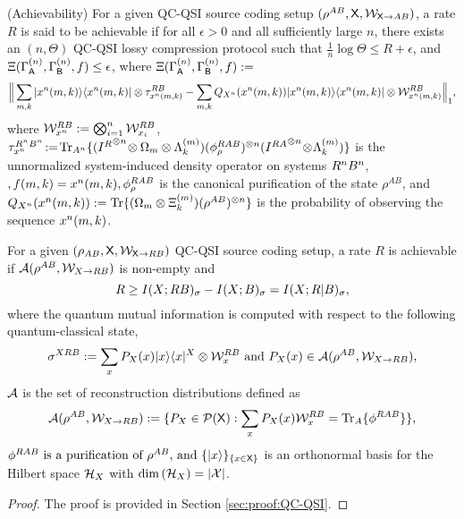 \begin{definition}\label{def:qc_qsi_achievability}
    (Achievability) For a given QC-QSI source coding setup $(\rho^{AB},\mathsf{X},\mathcal{W}_{\mathsf{X}\rightarrow AB})$, a rate $R$ is said to be achievable if for all $\epsilon > 0$ and all sufficiently large $n$, there exists an $(n,\Theta)$ QC-QSI lossy compression protocol such that 
$\frac{1}{n}\log \Theta \leq R + \epsilon$, and $\Xi(\Gamma^{(n)}_{\mathsf{A}},\Gamma^{(n)}_{\mathsf{B}},f) \leq \epsilon$, where 
$\Xi(\Gamma^{(n)}_{\mathsf{A}},\Gamma^{(n)}_{\mathsf{B}},f) :=$ 
\begin{align*}
    \Big\| \sum_{m,k} |x^n(m,k)\rangle\langle x^n(m,k)| \otimes \tau^{R B}_{x^n(m,k)}   - \sum_{m,k}  Q_{X^n}(x^n(m,k))|x^n(m,k)\rangle\langle x^n(m,k)| \otimes \mathcal{W}_{x^n(m,k)}^{RB}\Big\|_1,
\end{align*}
where $\mathcal{W}_{x^n}^{RB} := \bigotimes_{i=1}^n \mathcal{W}_{x_i}^{RB}$,  $\tau^{R^nB^n}_{x^n}\!:= \!\text{Tr}_{A^n}\{({I^{R}}^{\otimes n}\!\otimes \Omega_{m} \otimes \Lambda^{(m)}_k) (\phi^{RAB}_\rho)^{\otimes n}({I^{R A}}^{\otimes n}\! \otimes\!\Lambda^{(m)}_k)\}$ is the unnormalized system-induced density operator on systems $R^nB^n$, $, f(m,k) = x^n(m,k), \phi_{\rho}^{RAB}$ is the canonical purification of the state $\rho^{AB}$, and $Q_{X^n}(x^n(m,k)) := \text{Tr}\{(\Omega_{m} \otimes \Xi^{(m)}_k) (\rho^{AB})^{\otimes n}\}$ is the probability of observing the sequence $x^n(m,k)$.
\end{definition}
\begin{theorem}\label{thm:QC-QSI}For a given $(\rho_{AB},\mathsf{X},\mathcal{W}_{\mathsf{X}\rightarrow R B})$ QC-QSI source coding setup, 
a rate $R$ is achievable if $\mathcal{A}(\rho^{AB},\mathcal{W}_{X\rightarrow R B})$ is non-empty and
    $$R\geq I(X;R  B)_\sigma-I(X;B)_\sigma = I(X;R |B)_\sigma,$$
    where the quantum mutual information is computed with respect to the following quantum-classical state, $$\sigma^{XRB} := \sum_x P_X(x) |x\rangle\langle x|^X \otimes \mathcal{W}_x^{RB} \text{ and }  P_X(x) \in \mathcal{A}(\rho^{AB},\mathcal{W}_{X\rightarrow R B}),$$
    $\mathcal{A}$ is the set of reconstruction distributions defined as 
$$\mathcal{A}(\rho^{AB},\mathcal{W}_{X\rightarrow R B}) := \{P_X\in\mathcal{P}(\mathsf{X}):\sum_{x}P_X(x)\mathcal{W}^{R B}_x = \text{Tr}_{A}\{\phi^{R AB}\}\},$$ 
    $\phi^{R AB}  \text{ is a purification of $\rho^{AB}$, and } \{|x\rangle\}_{\{x\in \mathsf{X}\}}$ is an orthonormal basis 
    for the Hilbert space $\mathcal{H}_X$ with $\dim{(\mathcal{H}_X)}=|\mathcal{X}|$.
\end{theorem}
\begin{proof}
    The proof is provided in Section \ref{sec:proof:QC-QSI}.
\end{proof}

